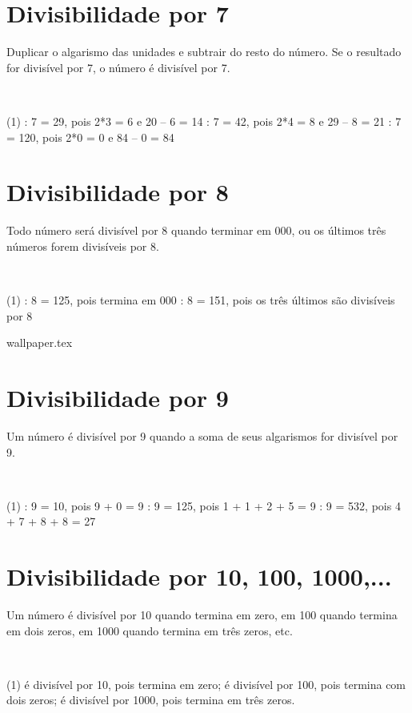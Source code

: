 \documentclass[10pt]{article}
\begin{document}
\section*{Divisibilidade por 7}
Duplicar o algarismo das unidades e subtrair do resto do número. Se o resultado for divisível por 7, o número é divisível por 7. 
\begin{exemplo}~\\
   \begin{tasks}(1)  
         : 7 = 29, pois 2*3 = 6 e 20 – 6 = 14
         : 7 = 42, pois 2*4 = 8 e 29 – 8 = 21
         : 7 = 120, pois 2*0 = 0 e 84 – 0 = 84 
   \end{tasks}
\end{exemplo}

\section*{Divisibilidade por 8}
Todo número será divisível por 8 quando terminar em 000, ou os últimos três números forem divisíveis por 8. 
\begin{exemplo}~\\
   \begin{tasks}(1)        
     : 8 = 125, pois termina em 000
     : 8 = 151, pois os três últimos são divisíveis por 8
   \end{tasks}
\end{exemplo}

\newpage
{wallpaper.tex} %
\section*{Divisibilidade por 9}
Um número é divisível por 9 quando a soma de seus algarismos for divisível por 9. 
\begin{exemplo}~\\
   \begin{tasks}(1)       
     : 9 = 10, pois 9 + 0 = 9
     : 9 = 125, pois 1 + 1 + 2 + 5 = 9
     : 9 = 532, pois 4 + 7 + 8 + 8 = 27
   \end{tasks}
\end{exemplo}

\section*{Divisibilidade por 10, 100, 1000,...}
Um número é divisível por 10 quando termina em zero, em 100 quando termina em dois zeros, em 1000 quando
termina em três zeros, etc. 
\begin{exemplo}~\\
   \begin{tasks}(1)
        é divisível por 10, pois termina em zero;
         é divisível por 100, pois termina com dois zeros;
         é divisível por 1000, pois termina em três
zeros. 
   \end{tasks}
\end{exemplo}
\end{document}
